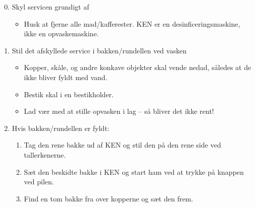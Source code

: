 \documentclass{article}
\begin{document}

\maketitle

\fontsize{17.28}{18}\selectfont

\begin{enumerate}

\setcounter{enumi}{-1}

\bfseries \item Skyl servicen grundigt af \normalfont

  \begin{itemize}

  \item Husk at fjerne alle mad/kafferester.  KEN er en
    desinficeringsmaskine, ikke en opvaskemaskine.

  \end{itemize}

\bfseries \item Stil det afskyllede service i bakken/rundellen ved vasken
\normalfont

  \begin{itemize}

  \item Kopper, skåle, og andre konkave objekter skal vende nedad,
    således at de ikke bliver fyldt med vand.

  \item Bestik skal i en bestikholder.

  \item Lad vær med at stille opvasken i lag -- så bliver det ikke rent!

  \end{itemize}

\bfseries \item Hvis bakken/rundellen er fyldt: \normalfont
  \begin{enumerate}

  \item Tag den rene bakke ud af KEN og stil den på den rene side ved
    tallerkenerne.

  \item Sæt den beskidte bakke i KEN og start ham ved at trykke på
    knappen ved pilen.

  \item Find en tom bakke fra over kopperne og sæt den frem.

  \end{enumerate}


\end{enumerate}
\end{document}
